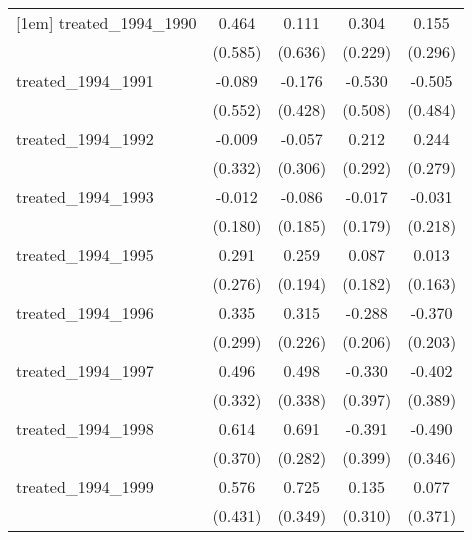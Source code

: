 {\begin{tabular}{l*{4}{c}}
[1em]
treated\_1994\_1990&       0.464         &       0.111         &       0.304         &       0.155         \\
            &     (0.585)         &     (0.636)         &     (0.229)         &     (0.296)         \\
[1em]
treated\_1994\_1991&      -0.089         &      -0.176         &      -0.530         &      -0.505         \\
            &     (0.552)         &     (0.428)         &     (0.508)         &     (0.484)         \\
[1em]
treated\_1994\_1992&      -0.009         &      -0.057         &       0.212         &       0.244         \\
            &     (0.332)         &     (0.306)         &     (0.292)         &     (0.279)         \\
[1em]
treated\_1994\_1993&      -0.012         &      -0.086         &      -0.017         &      -0.031         \\
            &     (0.180)         &     (0.185)         &     (0.179)         &     (0.218)         \\
[1em]
treated\_1994\_1995&       0.291         &       0.259         &       0.087         &       0.013         \\
            &     (0.276)         &     (0.194)         &     (0.182)         &     (0.163)         \\
[1em]
treated\_1994\_1996&       0.335         &       0.315         &      -0.288         &      -0.370         \\
            &     (0.299)         &     (0.226)         &     (0.206)         &     (0.203)         \\
[1em]
treated\_1994\_1997&       0.496         &       0.498         &      -0.330         &      -0.402         \\
            &     (0.332)         &     (0.338)         &     (0.397)         &     (0.389)         \\
[1em]
treated\_1994\_1998&       0.614         &       0.691\sym{*}  &      -0.391         &      -0.490         \\
            &     (0.370)         &     (0.282)         &     (0.399)         &     (0.346)         \\
[1em]
treated\_1994\_1999&       0.576         &       0.725\sym{*}  &       0.135         &       0.077         \\
            &     (0.431)         &     (0.349)         &     (0.310)         &     (0.371)         \\

\end{tabular}}
